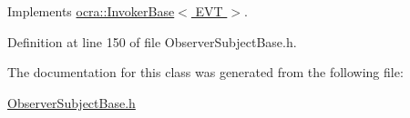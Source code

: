 Implements \hyperlink{classocra_1_1InvokerBase_ae4d7537a1b2c0aa9b5188c5da8423289}{ocra\+::\+Invoker\+Base$<$ E\+V\+T $>$}.



Definition at line 150 of file Observer\+Subject\+Base.\+h.



The documentation for this class was generated from the following file\+:\begin{DoxyCompactItemize}
\item 
\hyperlink{ObserverSubjectBase_8h}{Observer\+Subject\+Base.\+h}\end{DoxyCompactItemize}
